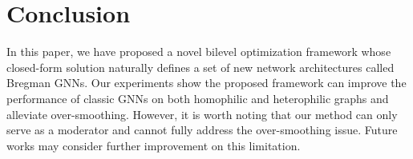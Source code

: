 \documentclass{article}
\begin{document}
\section{Conclusion}
\label{sec:conclusion}
In this paper, we have proposed a novel bilevel optimization framework whose closed-form solution naturally defines a set of new network architectures called Bregman GNNs. Our experiments show the proposed framework can improve the performance of classic GNNs on both homophilic and heterophilic graphs and alleviate over-smoothing. However, it is worth noting that our method can only serve as a moderator and cannot fully address the over-smoothing issue. Future works may consider further improvement on this limitation.







\end{document}
